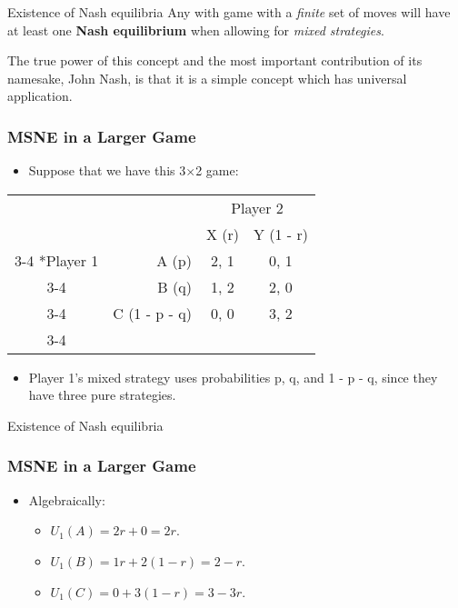 \begin{frame}{Existence of Nash equilibria}
  Any with game with a \textit{finite} set of moves
  will have at least one \textbf{Nash equilibrium}
  when allowing for \textit{mixed strategies}.

  The true power of this concept and the most important 
  contribution of its namesake, John Nash,
  is that it is a simple concept which has universal application.
\end{frame}

\begin{frame}
\frametitle{MSNE in a Larger Game}
\begin{itemize}
	\item Suppose that we have this 3$\times$2 game:
\end{itemize}
\begin{table}[h]
\centering
\begin{tabular}{cr|c|c|}
	& \multicolumn{1}{c}{} & \multicolumn{2}{c}{Player 2}\\
	& \multicolumn{1}{c}{} & \multicolumn{1}{c}{X (r)}  & \multicolumn{1}{c}{Y (1 - r)} \\\cline{3-4}
	\multirow{3}*{Player 1}  & A (p) & 2, 1 & 0, 1 \\\cline{3-4}
	& B (q) & 1, 2 & 2, 0 \\\cline{3-4}
	& C (1 - p - q) & 0, 0 & 3, 2 \\\cline{3-4}
\end{tabular}
\end{table}
\begin{itemize}
	\item Player 1's mixed strategy uses probabilities p, q, and 1 - p - q, since they have three pure strategies.
\end{itemize}
\end{frame}

\begin{frame}{Existence of Nash equilibria}
\frametitle{MSNE in a Larger Game}
\begin{itemize}
	\item Algebraically:
	\begin{itemize}
		\item $U_1(A) = 2r + 0 = 2r$.
		\item $U_1(B) = 1r + 2(1 - r) = 2 - r$.
		\item $U_1(C) = 0 + 3(1 - r) = 3 - 3r$.
	\end{itemize}
	\end{itemize}
\end{frame}

